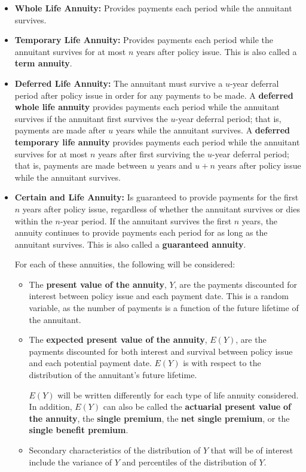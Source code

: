 \documentclass[]{book}
\begin{document}
\begin{itemize}
\item
  \textbf{Whole Life Annuity:} Provides payments each period while the
  annuitant survives.
\item
  \textbf{Temporary Life Annuity:} Provides payments each period while
  the annuitant survives for at most \(n\) years after policy issue.
  This is also called a \textbf{term annuity}.
\item
  \textbf{Deferred Life Annuity:} The annuitant must survive a
  \(u\)-year deferral period after policy issue in order for any
  payments to be made. A \textbf{deferred whole life annuity} provides
  payments each period while the annuitant survives if the annuitant
  first survives the \(u\)-year deferral period; that is, payments are
  made after \(u\) years while the annuitant survives. A
  \textbf{deferred temporary life annuity} provides payments each period
  while the annuitant survives for at most \(n\) years after first
  surviving the \(u\)-year deferral period; that is, payments are made
  between \(u\) years and \(u + n\) years after policy issue while the
  annuitant survives.
\item
  \textbf{Certain and Life Annuity:} Is guaranteed to provide payments
  for the first \(n\) years after policy issue, regardless of whether
  the annuitant survives or dies within the \(n\)-year period. If the
  annuitant survives the first \(n\) years, the annuity continues to
  provide payments each period for as long as the annuitant survives.
  This is also called a \textbf{guaranteed annuity}.

  For each of these annuities, the following will be considered:

  \begin{itemize}
  \item
    The \textbf{present value of the annuity}, \(Y\), are the payments
    discounted for interest between policy issue and each payment date.
    This is a random variable, as the number of payments is a function
    of the future lifetime of the annuitant.
  \item
    The \textbf{expected present value of the annuity}, \(E(Y)\), are
    the payments discounted for both interest and survival between
    policy issue and each potential payment date. \(E(Y)\) is with
    respect to the distribution of the annuitant's future lifetime.

    \(E(Y)\) will be written differently for each type of life annuity
    considered. In addition, \(E(Y)\) can also be called the
    \textbf{actuarial present value} \textbf{of the annuity}, the
    \textbf{single premium}, the \textbf{net single premium}, or the
    \textbf{single benefit premium}.
  \item
    Secondary characteristics of the distribution of \(Y\) that will be
    of interest include the variance of \(Y\) and percentiles of the
    distribution of \(Y\).
  \end{itemize}
\end{itemize}
\end{document}
